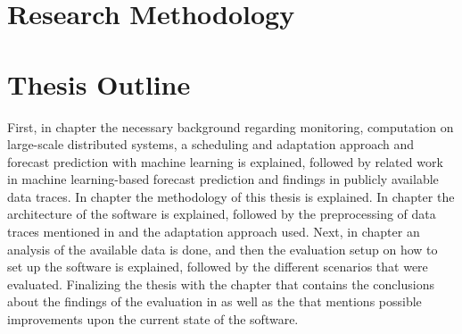         \section{Research Methodology}
        \label{sec:research-methodology-introduction}

        

        
        \section{Thesis Outline}
        \label{sec:thesis-outline-introduction}

            First, in chapter  the necessary background regarding monitoring, computation on large-scale distributed systems, a scheduling and adaptation approach and forecast prediction with machine learning is explained, followed by related work in machine learning-based forecast prediction and findings in publicly available data traces.
            In chapter  the methodology of this thesis is explained. 
            In chapter  the architecture of the software is explained, followed by the preprocessing of data traces mentioned in  and the adaptation approach used.
            Next, in chapter  an analysis of the available data is done, and then the evaluation setup on how to set up the software is explained, followed by the different scenarios that were evaluated. 
            Finalizing the thesis with the chapter  that contains the conclusions about the findings of the evaluation in  as well as the  that mentions possible improvements upon the current state of the software.


